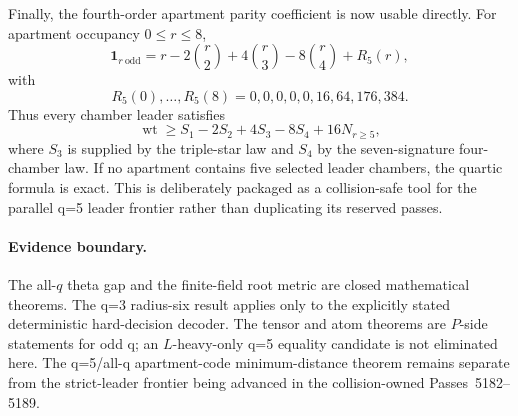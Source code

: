 Finally, the fourth-order apartment parity coefficient is now usable directly.  For apartment occupancy $0\le r\le8$,
\[
 \mathbf1_{r\ \mathrm{odd}}=r-2\binom r2+4\binom r3-8\binom r4+R_5(r),
\]
with
\[
 R_5(0),\ldots,R_5(8)=0,0,0,0,0,16,64,176,384.
\]
Thus every chamber leader satisfies
\[
 \boxed{\operatorname{wt}\ge S_1-2S_2+4S_3-8S_4+16N_{r\ge5},}
\]
where $S_3$ is supplied by the triple-star law and $S_4$ by the seven-signature four-chamber law.  If no apartment contains five selected leader chambers, the quartic formula is exact.  This is deliberately packaged as a collision-safe tool for the parallel q=5 leader frontier rather than duplicating its reserved passes.

\paragraph{Evidence boundary.}
The all-$q$ theta gap and the finite-field root metric are closed mathematical theorems.  The q=3 radius-six result applies only to the explicitly stated deterministic hard-decision decoder.  The tensor and atom theorems are $P$-side statements for odd q; an $L$-heavy-only q=5 equality candidate is not eliminated here.  The q=5/all-q apartment-code minimum-distance theorem remains separate from the strict-leader frontier being advanced in the collision-owned Passes~5182--5189.
\fi

